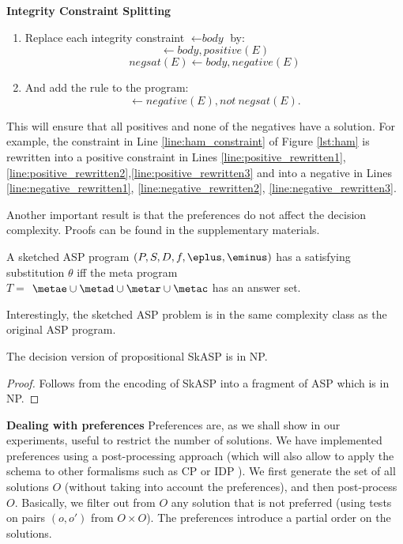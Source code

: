 \vspace{3pt}
\textbf{Integrity Constraint Splitting} 
\begin{enumerate}
  \item Replace each integrity constraint $\leftarrow \textit{body}$ by: 
$$\leftarrow \textit{body}, \textit{positive}(E) $$
$$\textit{negsat}(E) \leftarrow \textit{body}, \textit{negative}(E) $$
\item
And add the rule to the program:
$$ \leftarrow \textit{negative}(E), \textit{not} ~ \textit{negsat}(E).$$ 
\end{enumerate}
This will ensure that all positives and none of the negatives have a solution. For example, the constraint in Line \ref{line:ham_constraint} of Figure \ref{lst:ham} is rewritten into a positive constraint in Lines \ref{line:positive_rewritten1}, \ref{line:positive_rewritten2},\ref{line:positive_rewritten3} and into a negative in Lines \ref{line:negative_rewritten1}, \ref{line:negative_rewritten2}, \ref{line:negative_rewritten3}.


Another important result is that the preferences do not affect the decision complexity. Proofs can be found in the supplementary materials. 
\begin{theorem}
  A sketched ASP program $(P, S, D, f, \eplus,\eminus)$ has a satisfying substitution $\theta$ iff the meta program \\$T=$ \mbox{$\metae\cup\metad \cup \metar \cup \metac$} has an answer set.
  \label{theorem:rewriting}
\end{theorem}
Interestingly, the sketched ASP problem is in the same complexity class as the original ASP program.
\begin{theorem}
  The decision version of propositional SkASP is in NP.
  \label{theorem:complexity_sat}
\end{theorem}
\begin{proof} 
Follows from the encoding of SkASP into a fragment of ASP which is in NP. 
\end{proof}
\textbf{Dealing with preferences} 
Preferences are, as we shall show in our experiments, useful to restrict the number of solutions.
We have implemented preferences using a post-processing approach (which will also allow to apply the schema to other formalisms such as CP or IDP \cite{idp}).
We first generate the set of all solutions $O$ (without taking into account the preferences), and then post-process $O$. Basically, we filter out
from $O$ any solution that is not preferred (using tests on pairs $(o,o')$ from $O \times O$). %
The preferences introduce a partial order on the solutions. 

